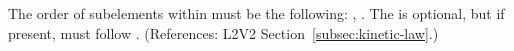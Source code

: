 The order of subelements within \KineticLaw must be the following:
, .  The  is
optional, but if present, must follow .  (References: L2V2
Section~\ref{subsec:kinetic-law}.)

